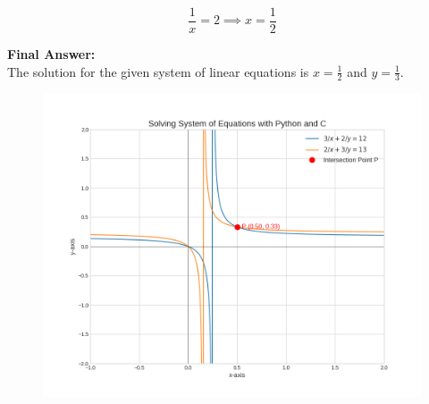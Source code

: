 \documentclass[journal,12pt,onecolumn]{IEEEtran}
\theoremstyle{remark}
\begin{document}
\begin{equation}
    \frac{1}{x} = 2 \implies x = \frac{1}{2}
\end{equation}

\textbf{Final Answer: }\\
The solution for the given system of linear equations is $x = \frac{1}{2}$ and $y = \frac{1}{3}$.

\begin{figure}[H]
    \centering
    \includegraphics[width=0.75\columnwidth]{figs/1.png}
    \caption{}
\end{figure}
\end{document}
